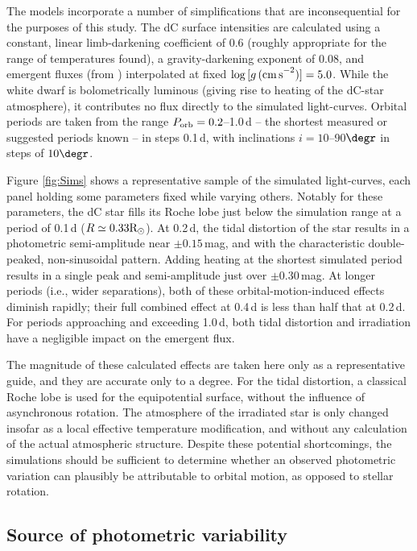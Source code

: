 \documentclass[fleqn,usenatbib,useAMS]{mnras}
\newcommand{\Rsun}{\ensuremath{\rm{R}_\odot}}
\begin{document}
The models incorporate a number of simplifications that are inconsequential for the purposes of this study.  The dC surface intensities are calculated using a constant, linear limb-darkening coefficient of 0.6 (roughly appropriate for the range of temperatures found), a gravity-darkening exponent of 0.08, and emergent fluxes (from \citealt{Howarth11}) interpolated at fixed $\log\,[g\,{\rm (cm\,s}^{-2})] = 5.0$.
While the white dwarf is bolometrically luminous (giving rise to heating of the dC-star atmosphere), it contributes no flux directly to the simulated light-curves.  Orbital periods are taken from the range $P_{\rm orb}=0.2$--1.0\,d -- the shortest measured or suggested periods known -- in steps 0.1\,d, with inclinations $i=10$--90$\degr$ in steps of $10\degr$.

Figure \ref{fig:Sims} shows a representative sample of the simulated light-curves, each panel holding some parameters fixed while varying others.  Notably for these parameters, the dC star fills its Roche lobe just below the simulation range at a period of 0.1\,d ($R \simeq 0.33\Rsun$).  At 0.2\,d, the tidal distortion of the star results in a photometric semi-amplitude near $\pm0.15$\,mag, and with the characteristic double-peaked, non-sinusoidal pattern.  Adding heating at the shortest simulated period results in a single peak and semi-amplitude just over $\pm0.30$\,mag.  At longer periods (i.e., wider separations), both of these orbital-motion-induced effects diminish rapidly; their full combined effect at 0.4\,d is less than half that at 0.2\,d.  For periods approaching and exceeding 1.0\,d, both tidal distortion and irradiation have a negligible impact on the emergent flux.

The magnitude of these calculated effects are taken here only as a representative guide, and they are accurate only to a degree.  For the tidal distortion, a classical Roche lobe is used for the equipotential surface, without the influence of asynchronous rotation.  The atmosphere of the irradiated star is only changed insofar as a local effective temperature modification, and without any calculation of the actual atmospheric structure.  Despite these potential shortcomings, the simulations should be sufficient to determine whether an observed photometric variation can plausibly be attributable to orbital motion, as opposed to stellar rotation.  



\subsection{Source of photometric variability}
\end{document}
